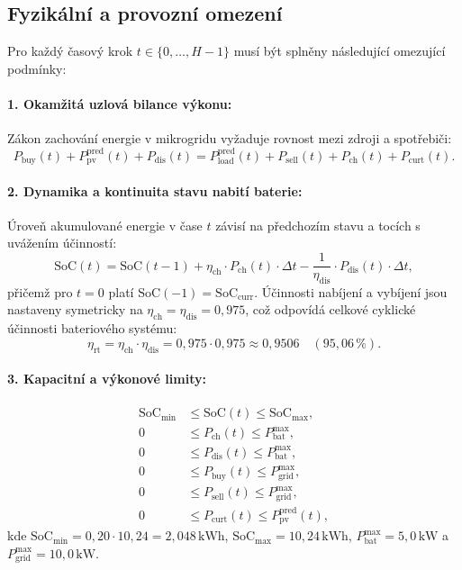\documentclass[FM,BP]{tulthesis}
\begin{document}
	\subsection{Fyzikální a provozní omezení}
	Pro každý časový krok $t \in \{0, \dots, H-1\}$ musí být splněny následující omezující podmínky:

	\paragraph{1. Okamžitá uzlová bilance výkonu:}
	Zákon zachování energie v mikrogridu vyžaduje rovnost mezi zdroji a spotřebiči:
	\begin{equation}
		\label{eq:power_balance}
		P_{\text{buy}}(t) + P_{\text{pv}}^{\text{pred}}(t) + P_{\text{dis}}(t) = P_{\text{load}}^{\text{pred}}(t) + P_{\text{sell}}(t) + P_{\text{ch}}(t) + P_{\text{curt}}(t).
	\end{equation}

	\paragraph{2. Dynamika a kontinuita stavu nabití baterie:}
	Úroveň akumulované energie v čase $t$ závisí na předchozím stavu a tocích s uvážením účinností:
	\begin{equation}
		\label{eq:soc_continuity}
		\mathrm{SoC}(t) = \mathrm{SoC}(t-1) + \eta_{\text{ch}} \cdot P_{\text{ch}}(t) \cdot \Delta t - \frac{1}{\eta_{\text{dis}}} \cdot P_{\text{dis}}(t) \cdot \Delta t,
	\end{equation}
	přičemž pro $t = 0$ platí $\mathrm{SoC}(-1) = \mathrm{SoC}_{\text{curr}}$. Účinnosti nabíjení a vybíjení jsou nastaveny symetricky na $\eta_{\text{ch}} = \eta_{\text{dis}} = 0{,}975$, což odpovídá celkové cyklické účinnosti bateriového systému:
	\begin{equation}
		\eta_{\text{rt}} = \eta_{\text{ch}} \cdot \eta_{\text{dis}} = 0{,}975 \cdot 0{,}975 \approx 0{,}9506 \quad (95{,}06\,\%).
	\end{equation}

	\paragraph{3. Kapacitní a výkonové limity:}
	\begin{align}
		\mathrm{SoC}_{\min} &\le \mathrm{SoC}(t) \le \mathrm{SoC}_{\max}, \label{eq:soc_limits} \\
		0 &\le P_{\text{ch}}(t) \le P_{\text{bat}}^{\max}, \label{eq:pch_limits} \\
		0 &\le P_{\text{dis}}(t) \le P_{\text{bat}}^{\max}, \label{eq:pdis_limits} \\
		0 &\le P_{\text{buy}}(t) \le P_{\text{grid}}^{\max}, \label{eq:pbuy_limits} \\
		0 &\le P_{\text{sell}}(t) \le P_{\text{grid}}^{\max}, \label{eq:psell_limits} \\
		0 &\le P_{\text{curt}}(t) \le P_{\text{pv}}^{\text{pred}}(t), \label{eq:pcurt_limits}
	\end{align}
	kde $\mathrm{SoC}_{\min} = 0{,}20 \cdot 10{,}24 = 2{,}048\,\text{kWh}$, $\mathrm{SoC}_{\max} = 10{,}24\,\text{kWh}$, $P_{\text{bat}}^{\max} = 5{,}0\,\text{kW}$ a $P_{\text{grid}}^{\max} = 10{,}0\,\text{kW}$.
\end{document}
